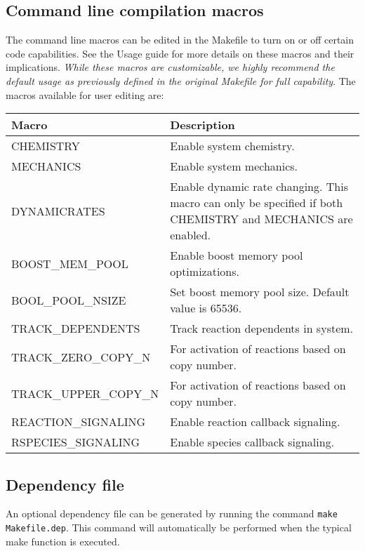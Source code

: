 \documentclass[11pt, oneside]{article}   	%
\begin{document}
\subsection {Command line compilation macros}

The command line macros can be edited in the Makefile to turn on or off certain code capabilities. See the Usage guide for more details on these macros and their implications. \textit{While these macros are customizable, we highly recommend the default usage as previously defined in the original Makefile for full capability}. The macros available for user editing are: \newline

\small
\begin{table} [!ht]
\centering
\begin{tabular}{|L{5cm}|L{9cm}|}  
\hline
 \textbf{Macro} & \textbf{Description} \\
 \hline
  CHEMISTRY & Enable system chemistry. \\
  \hline
  MECHANICS & Enable system mechanics. \\ 
  \hline
  DYNAMICRATES & Enable dynamic rate changing. This macro can only be specified if both CHEMISTRY and
  MECHANICS are enabled. \\
  \hline
  BOOST\_MEM\_POOL & Enable boost memory pool optimizations. \\
  \hline
   BOOL\_POOL\_NSIZE & Set boost memory pool size. Default value is 65536. \\
  \hline
   TRACK\_DEPENDENTS & Track reaction dependents in system. \\
  \hline
    TRACK\_ZERO\_COPY\_N & For activation of reactions based on copy number. \\
  \hline
     TRACK\_UPPER\_COPY\_N & For activation of reactions based on copy number. \\
  \hline
     REACTION\_SIGNALING & Enable reaction callback signaling. \\
  \hline
     RSPECIES\_SIGNALING & Enable species callback signaling.\\
  \hline
\end{tabular}
\end{table}
\normalsize

	
\subsection {Dependency file}

An optional dependency file can be generated by running the command  \texttt{make Makefile.dep}. This command will automatically be performed when the typical make function is executed.
\end{document}
